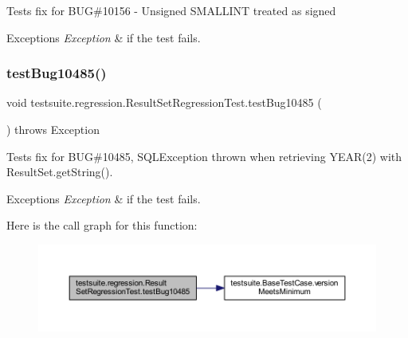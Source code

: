 Tests fix for B\+UG\#10156 -\/ Unsigned S\+M\+A\+L\+L\+I\+NT treated as signed


\begin{DoxyExceptions}{Exceptions}
{\em Exception} & if the test fails. \\
\hline
\end{DoxyExceptions}
\mbox{\label{classtestsuite_1_1regression_1_1_result_set_regression_test_a636970914398d594bf3bb15b35d2388e}} 
\subsubsection{\texorpdfstring{test\+Bug10485()}{testBug10485()}}
{\footnotesize\ttfamily void testsuite.\+regression.\+Result\+Set\+Regression\+Test.\+test\+Bug10485 (\begin{DoxyParamCaption}{ }\end{DoxyParamCaption}) throws Exception}

Tests fix for B\+UG\#10485, S\+Q\+L\+Exception thrown when retrieving Y\+E\+A\+R(2) with Result\+Set.\+get\+String().


\begin{DoxyExceptions}{Exceptions}
{\em Exception} & if the test fails. \\
\hline
\end{DoxyExceptions}
Here is the call graph for this function\+:
\nopagebreak
\begin{figure}[H]
\begin{center}
\leavevmode
\includegraphics[width=350pt]{classtestsuite_1_1regression_1_1_result_set_regression_test_a636970914398d594bf3bb15b35d2388e_cgraph}
\end{center}
\end{figure}
\mbox{\label{classtestsuite_1_1regression_1_1_result_set_regression_test_aeb922ab7f293e6e7184ea654eb06a00a}} 
